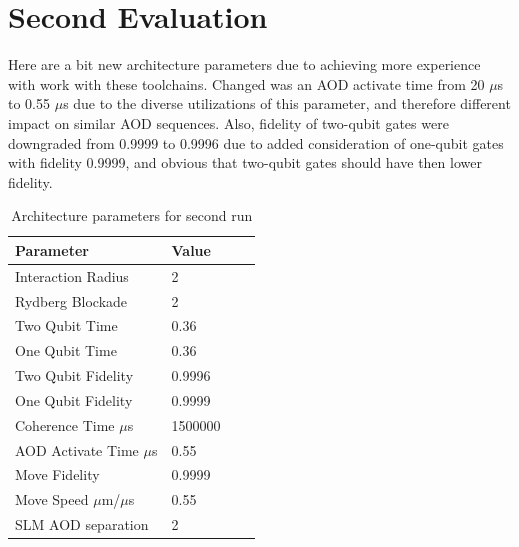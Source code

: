 \section{Second Evaluation}
Here are a bit new architecture parameters due to achieving more experience with work with these toolchains.
Changed was an \ac{AOD} activate time from 20 $\mu$s to 0.55 $\mu$s due to the diverse utilizations of this parameter,
and therefore different impact on similar \ac{AOD} sequences.
Also, fidelity of two-qubit gates were downgraded from 0.9999 to 0.9996 
due to added consideration of one-qubit gates with fidelity 0.9999,
and obvious that two-qubit gates should have then lower fidelity.
\begin{table}[htpb]
  \caption[Architecture Second Run]{Architecture parameters for second run}\label{tab:architecture_second}
  \centering
  \begin{tabular}{l l l l}
    \toprule
      Parameter & Value \\
    \midrule
      Interaction Radius & 2 \\
      Rydberg Blockade & 2 \\
      Two Qubit Time & 0.36 \\
      One Qubit Time & 0.36 \\
      Two Qubit Fidelity & 0.9996 \\
      One Qubit Fidelity & 0.9999 \\
      Coherence Time $\mu$s & 1500000 \\
      AOD Activate Time $\mu$s & 0.55 \\
      Move Fidelity  & 0.9999 \\
      Move Speed $\mu$m/$\mu$s & 0.55 \\
      SLM AOD separation & 2\\
    \bottomrule
  \end{tabular}
\end{table}

